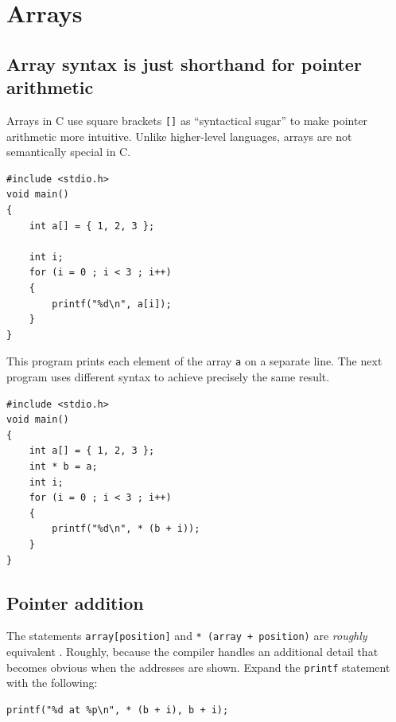 \documentclass{book}
\begin{document}
\section{Arrays}
\subsection{Array syntax is just shorthand for pointer arithmetic}

Arrays in C use square brackets \texttt{[]} as ``syntactical sugar'' to make pointer arithmetic more intuitive. Unlike higher-level languages, arrays are not semantically special in C.

\begin{lstlisting}[caption={Arrays contain consecutive datum of the same type}, captionpos=b, mathescape, xleftmargin=.25in, xrightmargin=.25in]
#include <stdio.h>
void main()
{
    int a[] = { 1, 2, 3 };
    
    int i;
    for (i = 0 ; i < 3 ; i++)
    {
        printf("%d\n", a[i]);    
    }
}
\end{lstlisting}

This program prints each element of the array \texttt{a} on a separate line. The next program uses different syntax to achieve precisely the same result.

\begin{lstlisting}[caption={Square-bracket arrays in C are just pointers}, captionpos=b, mathescape, xleftmargin=.25in, xrightmargin=.25in]
#include <stdio.h>
void main()
{
    int a[] = { 1, 2, 3 };
    int * b = a;
    int i;
    for (i = 0 ; i < 3 ; i++)
    {
        printf("%d\n", * (b + i));
    }
}
\end{lstlisting}

\subsection{Pointer addition}

The statements \texttt{array[position]} and \texttt{* (array + position)} are \textit{roughly} equivalent \cite{lin_pointer_2003}. Roughly, because the compiler handles an additional detail that becomes obvious when the addresses are shown. Expand the \texttt{printf} statement with the following:

\begin{lstlisting}[caption={todo}, captionpos=b, mathescape, xleftmargin=.25in, xrightmargin=.25in]
        printf("%d at %p\n", * (b + i), b + i);
\end{lstlisting}
\end{document}
